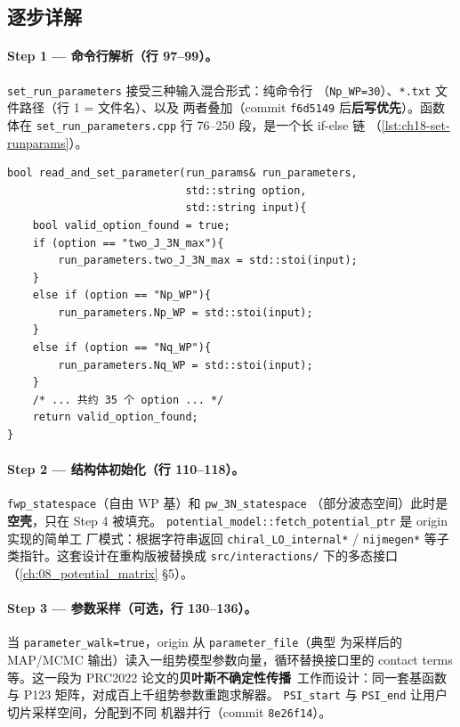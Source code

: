 \subsection*{逐步详解}

\paragraph{Step 1 — 命令行解析（行 97--99）。}
\texttt{set\_run\_parameters} 接受三种输入混合形式：纯命令行
（\texttt{Np\_WP=30}）、\texttt{*.txt} 文件路径（行 1 = 文件名）、以及
两者叠加（commit \texttt{f6d5149} 后\textbf{后写优先}）。函数体在
\texttt{set\_run\_parameters.cpp} 行 76--250 段，是一个长 if-else 链
（\cref{lst:ch18-set-runparams}）。

\begin{lstlisting}[style=cpp, caption={\texttt{set\_run\_parameters.cpp} 行
76--110 节选——参数 setter 的 “if-else 链”模式。},
                   label={lst:ch18-set-runparams}]
bool read_and_set_parameter(run_params& run_parameters,
                            std::string option,
                            std::string input){
    bool valid_option_found = true;
    if (option == "two_J_3N_max"){
        run_parameters.two_J_3N_max = std::stoi(input);
    }
    else if (option == "Np_WP"){
        run_parameters.Np_WP = std::stoi(input);
    }
    else if (option == "Nq_WP"){
        run_parameters.Nq_WP = std::stoi(input);
    }
    /* ... 共约 35 个 option ... */
    return valid_option_found;
}
\end{lstlisting}

\paragraph{Step 2 — 结构体初始化（行 110--118）。}
\texttt{fwp\_statespace}（自由 WP 基）和 \texttt{pw\_3N\_statespace}
（部分波态空间）此时是\textbf{空壳}，只在 Step 4 被填充。
\texttt{potential\_model::fetch\_potential\_ptr} 是 origin 实现的简单工
厂模式：根据字符串返回 \texttt{chiral\_LO\_internal*} / \texttt{nijmegen*}
等子类指针。这套设计在重构版被替换成
\texttt{src/interactions/} 下的多态接口（\cref{ch:08_potential_matrix} §5）。

\paragraph{Step 3 — 参数采样（可选，行 130--136）。}
当 \texttt{parameter\_walk=true}，origin 从 \texttt{parameter\_file}（典型
为采样后的 MAP/MCMC 输出）读入一组势模型参数向量，循环替换接口里的
contact terms 等。这一段为 PRC2022 论文的\textbf{贝叶斯不确定性传播}\
工作而设计：同一套基函数与 P123 矩阵，对成百上千组势参数重跑求解器。
\texttt{PSI\_start} 与 \texttt{PSI\_end} 让用户切片采样空间，分配到不同
机器并行（commit \texttt{8e26f14}）。

